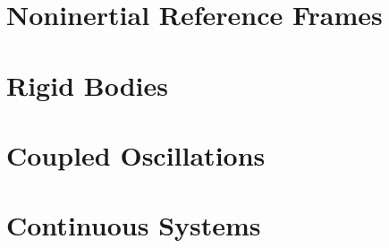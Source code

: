 \section{Noninertial Reference Frames}



\section{Rigid Bodies}




\section{Coupled Oscillations}




\section{Continuous Systems}




